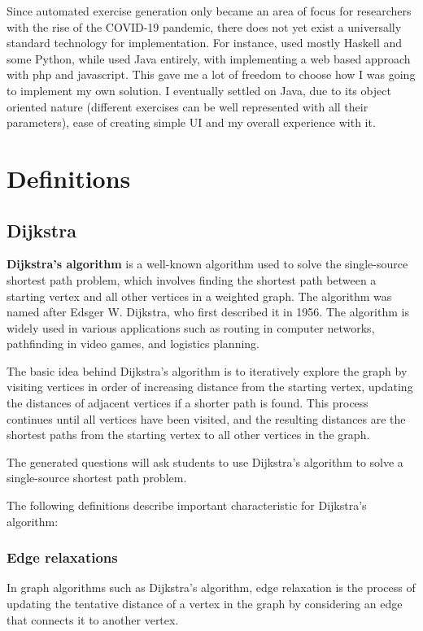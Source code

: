 \documentclass{l4proj}
\begin{document}
Since automated exercise generation only became an area of focus for researchers with the rise of the COVID-19 pandemic, there does not yet exist a universally standard technology for implementation. For instance, \citet{Hoz21} used mostly Haskell and some Python, while \citet {Esh22} used Java entirely, with \citet{Kot19} implementing a web based approach with php and javascript. This gave me a lot of freedom to choose how I was going to implement my own solution. I eventually settled on Java, due to its object oriented nature (different exercises can be well represented with all their parameters), ease of creating simple UI and my overall experience with it.

\section{Definitions}
\subsection{Dijkstra}
\cite{a}
\textbf{Dijkstra's algorithm} is a well-known algorithm used to solve the single-source shortest path problem, which involves finding the shortest path between a starting vertex and all other vertices in a weighted graph. The algorithm was named after Edsger W. Dijkstra, who first described it in 1956. The algorithm is widely used in various applications such as routing in computer networks, pathfinding in video games, and logistics planning.

The basic idea behind Dijkstra's algorithm is to iteratively explore the graph by visiting vertices in order of increasing distance from the starting vertex, updating the distances of adjacent vertices if a shorter path is found. This process continues until all vertices have been visited, and the resulting distances are the shortest paths from the starting vertex to all other vertices in the graph.

The generated questions will ask students to use Dijkstra's algorithm to solve a single-source shortest path problem.

The following definitions describe important characteristic for Dijkstra's algorithm:
\subsubsection{Edge relaxations}

In graph algorithms such as Dijkstra's algorithm, edge relaxation is the process of updating the tentative distance of a vertex in the graph by considering an edge that connects it to another vertex.
\end{document}

